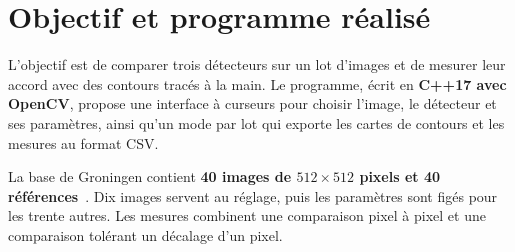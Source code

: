 \section{Objectif et programme réalisé}
L'objectif est de comparer trois détecteurs sur un lot d'images et de mesurer leur accord avec des contours tracés à la main. Le programme, écrit en \textbf{C++17 avec OpenCV}, propose une interface à curseurs pour choisir l'image, le détecteur et ses paramètres, ainsi qu'un mode par lot qui exporte les cartes de contours et les mesures au format CSV.

La base de Groningen contient \textbf{40 images de $512\times512$ pixels et 40 références}~\cite{groningen}. Dix images servent au réglage, puis les paramètres sont figés pour les trente autres. Les mesures combinent une comparaison pixel à pixel et une comparaison tolérant un décalage d'un pixel.
